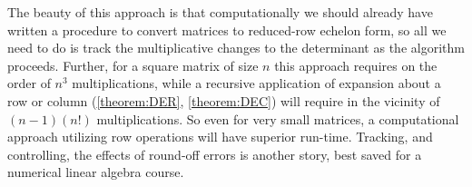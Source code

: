 \documentclass{ximera}
\begin{document}
\begin{example}
  The beauty of this approach is that computationally we should
  already have written a procedure to convert matrices to reduced-row
  echelon form, so all we need to do is track the multiplicative
  changes to the determinant as the algorithm proceeds.  Further, for
  a square matrix of size $n$ this approach requires on the order of
  $n^3$ multiplications, while a recursive application of expansion
  about a row or column (\ref{theorem:DER}, \ref{theorem:DEC}) will
  require in the vicinity of $(n-1)(n!)$ multiplications.  So even for
  very small matrices, a computational approach utilizing row
  operations will have superior run-time.  Tracking, and controlling,
  the effects of round-off errors is another story, best saved for a
  numerical linear algebra course.

\end{example}
\end{document}

